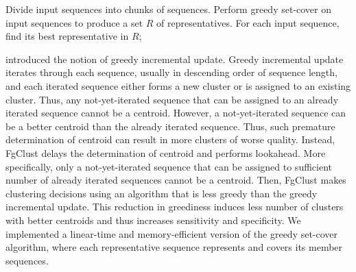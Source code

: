 \documentclass[11pt,letterpaper]{article}
\begin{document}
\begin{algorithm}
{	}
	Divide input sequences into chunks of sequences.\;
	Perform greedy set-cover on input sequences to produce a set \(R\) of representatives.\;
	For each input sequence, find its best representative in \(R\);
	\newline
\end{algorithm}

 introduced the notion of greedy incremental update.
Greedy incremental update iterates through each sequence, usually in descending order of sequence length, and each iterated sequence either forms a new cluster or is assigned to an existing cluster.
Thus, any not-yet-iterated sequence that can be assigned to an already iterated sequence cannot be a centroid.
However, a not-yet-iterated sequence can be a better centroid than the already iterated sequence.
Thus, such premature determination of centroid can result in more clusters of worse quality.
Instead, FgClust delays the determination of centroid and performs lookahead. 
More specifically, only a not-yet-iterated sequence that can be assigned to sufficient number of already iterated sequences cannot be a centroid.
Then, FgClust makes clustering decisions using an algorithm that is less greedy than the greedy incremental update.
This reduction in greediness induces less number of clusters with better centroids and thus increases sensitivity and specificity.
We implemented a linear-time and memory-efficient version of the greedy set-cover algorithm,
	where each representative sequence represents and covers its member sequences.
\end{document}
